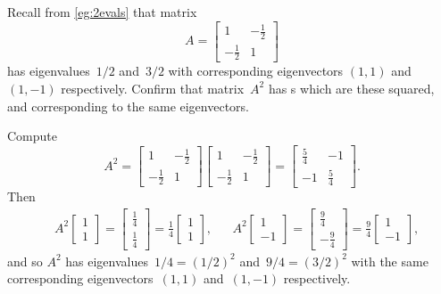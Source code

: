 \begin{example} \label{eg:2x2sympow}
Recall from \cref{eg:2evals} that matrix 
\begin{equation*}
A=\begin{bmatrix} 1&-\frac12\\-\frac12&1 \end{bmatrix}
\end{equation*}
has eigenvalues~\(1/2\) and~\(3/2\) with corresponding eigenvectors \((1,1)\) and~\((1,-1)\) respectively.
Confirm that matrix~\(A^2\) has s which are these squared, and corresponding to the same eigenvectors.
\begin{solution} 
Compute
\begin{equation*}
A^2=\begin{bmatrix} 1&-\frac12\\-\frac12&1 \end{bmatrix}
\begin{bmatrix} 1&-\frac12\\-\frac12&1 \end{bmatrix}
=\begin{bmatrix} \frac54&-1\\-1&\frac54 \end{bmatrix}.
\end{equation*}
Then
\begin{align*}
&A^2\begin{bmatrix} 1\\1 \end{bmatrix}
=\begin{bmatrix} \frac14\\ \frac14 \end{bmatrix}
=\frac14\begin{bmatrix} 1\\1 \end{bmatrix},
&&A^2\begin{bmatrix} 1\\-1 \end{bmatrix}
=\begin{bmatrix} \frac94\\-\frac94 \end{bmatrix}
=\frac94\begin{bmatrix} 1\\-1 \end{bmatrix},
\end{align*}
and so \(A^2\) has eigenvalues~\(1/4=(1/2)^2\) and~\(9/4=(3/2)^2\) with the same corresponding eigenvectors~\((1,1)\) and~\((1,-1)\) respectively.
\end{solution}
\end{example}



